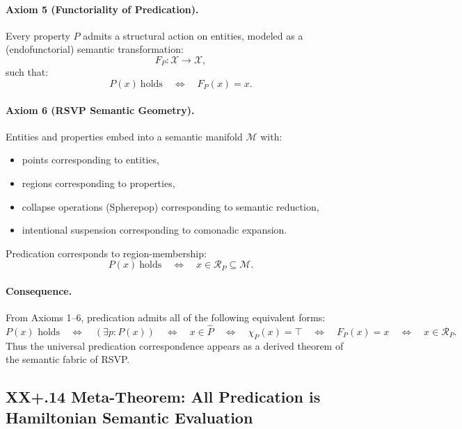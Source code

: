 \documentclass[12pt,letterpaper]{article}
\begin{document}
\paragraph{Axiom 5 (Functoriality of Predication).}
Every property $P$ admits a structural action on entities, modeled as a
(endofunctorial) semantic transformation:
\[
F_P : \mathcal{X} \to \mathcal{X},
\]
such that:
\[
P(x)\ \text{holds} \quad\Longleftrightarrow\quad F_P(x) = x.
\]

\paragraph{Axiom 6 (RSVP Semantic Geometry).}
Entities and properties embed into a semantic manifold $\mathcal{M}$ with:
\begin{itemize}
    \item points corresponding to entities,
    \item regions corresponding to properties,
    \item collapse operations (Spherepop) corresponding to semantic reduction,
    \item intentional suspension corresponding to comonadic expansion.
\end{itemize}

Predication corresponds to region-membership:
\[
P(x)\ \text{holds} \quad\Longleftrightarrow\quad x \in \mathcal{R}_P \subseteq \mathcal{M}.
\]

\paragraph{Consequence.}
From Axioms 1--6, predication admits all of the following equivalent forms:
\[
P(x) \text{ holds}
\quad\Longleftrightarrow\quad
(\exists p : P(x))
\quad\Longleftrightarrow\quad
x \in \widehat{P}
\quad\Longleftrightarrow\quad
\chi_P(x) = \top
\quad\Longleftrightarrow\quad
F_P(x) = x
\quad\Longleftrightarrow\quad
x \in \mathcal{R}_P.
\]
Thus the universal predication correspondence appears as a derived theorem of the
semantic fabric of RSVP.

\subsection{XX+.14 Meta-Theorem: All Predication is Hamiltonian Semantic Evaluation}
\end{document}
